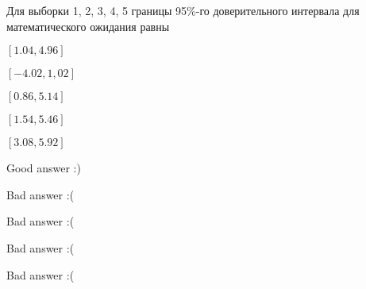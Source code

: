 
\begin{question}
Для выборки 1, 2, 3, 4, 5 границы 95\%-го доверительного интервала для
математического ожидания равны
\begin{answerlist}
  \item \([1.04, 4.96]\)
  \item \([-4.02, 1,02]\)
  \item \([0.86, 5.14]\)
  \item \([1.54, 5.46]\)
  \item \([3.08, 5.92]\)
\end{answerlist}
\end{question}

\begin{solution}
\begin{answerlist}
  \item Good answer :)
  \item Bad answer :(
  \item Bad answer :(
  \item Bad answer :(
  \item Bad answer :(
\end{answerlist}
\end{solution}

